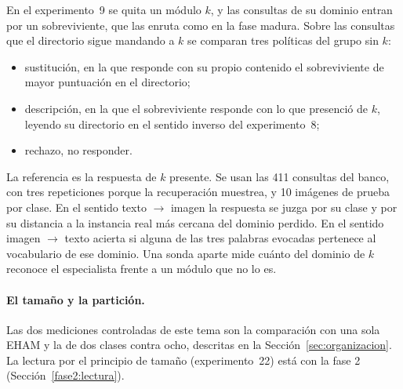 En el experimento~9 se quita un módulo $k$, y las consultas de su dominio entran por un
sobreviviente, que las enruta como en la fase madura.
Sobre las consultas que el directorio sigue mandando a $k$ se comparan tres políticas
del grupo sin $k$:
\begin{itemize}
    \item sustitución, en la que responde con su propio contenido el sobreviviente de
    mayor puntuación en el directorio;
    \item descripción, en la que el sobreviviente responde con lo que presenció de $k$,
    leyendo su directorio en el sentido inverso del experimento~8;
    \item rechazo, no responder.
\end{itemize}
La referencia es la respuesta de $k$ presente.
Se usan las 411 consultas del banco, con tres repeticiones porque la recuperación
muestrea, y 10 imágenes de prueba por clase.
En el sentido texto $\to$ imagen la respuesta se juzga por su clase y por su distancia
a la instancia real más cercana del dominio perdido.
En el sentido imagen $\to$ texto acierta si alguna de las tres palabras evocadas
pertenece al vocabulario de ese dominio.
Una sonda aparte mide cuánto del dominio de $k$ reconoce el especialista frente a un
módulo que no lo es.

\paragraph{El tamaño y la partición.}
Las dos mediciones controladas de este tema son la comparación con una sola EHAM y la
de dos clases contra ocho, descritas en la Sección~\ref{sec:organizacion}.
La lectura por el principio de tamaño (experimento~22) está con la fase 2
(Sección~\ref{fase2:lectura}).

